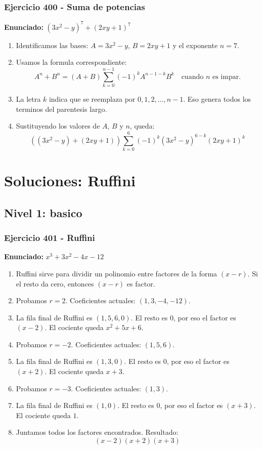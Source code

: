 \documentclass[11pt,a4paper]{article}
\newcommand{\nivel}[2]{\subsection*{Nivel #1: #2}\addcontentsline{toc}{subsection}{Nivel #1: #2}}
\begin{document}
\subsubsection*{Ejercicio 400 - Suma de potencias}
\textbf{Enunciado:} $ \left(3 x^{2} - y\right)^{7}+\left(2 x y + 1\right)^{7} $\par
\begin{enumerate}[leftmargin=2em]
\item Identificamos las bases: \(A=3 x^{2} - y\), \(B=2 x y + 1\) y el exponente \(n=7\).
\item Usamos la formula correspondiente: \[A^n+B^n=(A+B)\sum_{k=0}^{n-1}(-1)^kA^{n-1-k}B^k\quad\text{cuando }n\text{ es impar}.\]
\item La letra \(k\) indica que se reemplaza por \(0,1,2,\ldots,n-1\). Eso genera todos los terminos del parentesis largo.
\item Sustituyendo los valores de \(A\), \(B\) y \(n\), queda: \[\boxed{\left(\left(3 x^{2} - y\right)+\left(2 x y + 1\right)\right)\sum_{k=0}^{6}(-1)^k\left(3 x^{2} - y\right)^{6-k}\left(2 x y + 1\right)^k}\]
\end{enumerate}

\vspace{0.2cm}
\section{Soluciones: Ruffini}
\nivel{1}{basico}
\subsubsection*{Ejercicio 401 - Ruffini}
\textbf{Enunciado:} $ x^{3} + 3 x^{2} - 4 x - 12 $\par
\begin{enumerate}[leftmargin=2em]
\item Ruffini sirve para dividir un polinomio entre factores de la forma \((x-r)\). Si el resto da cero, entonces \((x-r)\) es factor.
\item Probamos \(r=2\). Coeficientes actuales: \((1, 3, -4, -12)\).
\item La fila final de Ruffini es \((1, 5, 6, 0)\). El resto es \(0\), por eso el factor es \((x-2)\). El cociente queda \(x^{2} + 5 x + 6\).
\item Probamos \(r=-2\). Coeficientes actuales: \((1, 5, 6)\).
\item La fila final de Ruffini es \((1, 3, 0)\). El resto es \(0\), por eso el factor es \((x+2)\). El cociente queda \(x + 3\).
\item Probamos \(r=-3\). Coeficientes actuales: \((1, 3)\).
\item La fila final de Ruffini es \((1, 0)\). El resto es \(0\), por eso el factor es \((x+3)\). El cociente queda \(1\).
\item Juntamos todos los factores encontrados. Resultado: \[\boxed{\left(x - 2\right) \left(x + 2\right) \left(x + 3\right)}\]
\end{enumerate}
\end{document}
